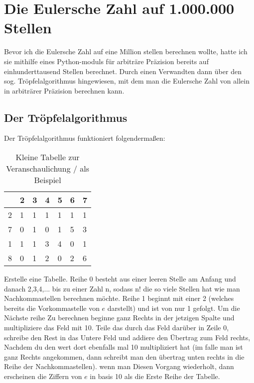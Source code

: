 \section{Die Eulersche Zahl auf 1.000.000 Stellen}
Bevor ich die Eulersche Zahl auf eine Million stellen berechnen wollte, hatte ich sie mithilfe eines Python-moduls für arbiträre Präzision bereits auf einhunderttausend Stellen berechnet. Durch einen Verwandten dann über den sog. Tröpfelalgorithmus hingewiesen, mit dem man die Eulersche Zahl von allein in arbiträrer Präzision berechnen kann.
\subsection{Der Tröpfelalgorithmus}
Der Tröpfelalgorithmus funktioniert folgendermaßen:
\begin{table}[h]
\centering
\begin{tabular}{|l|llllll|}
\hline
\rowcolor[HTML]{CBCEFB} 
  & 2 & 3 & 4 & 5 & 6 & 7 \\ \hline
2 & 1 & 1 & 1 & 1 & 1 & 1 \\
\rowcolor[HTML]{DAE8FC} 
7 & 0 & 1 & 0 & 1 & 5 & 3 \\
1 & 1 & 1 & 3 & 4 & 0 & 1 \\
\rowcolor[HTML]{DAE8FC} 
8 & 0 & 1 & 2 & 0 & 2 & 6 \\ \hline
\end{tabular}
\caption{Kleine Tabelle zur Veranschaulichung / als Beispiel}
\end{table}
\par Erstelle eine Tabelle. Reihe 0 besteht aus einer leeren Stelle am Anfang und danach 2,3,4,... bis zu einer Zahl n, sodass n! die so viele Stellen hat wie man Nachkommastellen berechnen möchte. Reihe 1 beginnt mit einer 2 (welches bereits die Vorkommastelle von $e$ darstellt) und ist von nur 1 gefolgt. Um die Nächste reihe Zu berechnen beginne ganz Rechts in der jetzigen Spalte und multipliziere das Feld mit 10. Teile das durch das Feld darüber in Zeile 0, schreibe den Rest in das Untere Feld und addiere den Übertrag zum Feld rechts, Nachdem du den wert dort ebenfalls mal 10 multipliziert hat (im falle man ist ganz Rechts angekommen, dann schreibt man den übertrag unten rechts in die Reihe der Nachkommastellen). wenn man Diesen Vorgang wiederholt, dann erscheinen die Ziffern von $e$ in basis 10 als die Erste Reihe der Tabelle.

